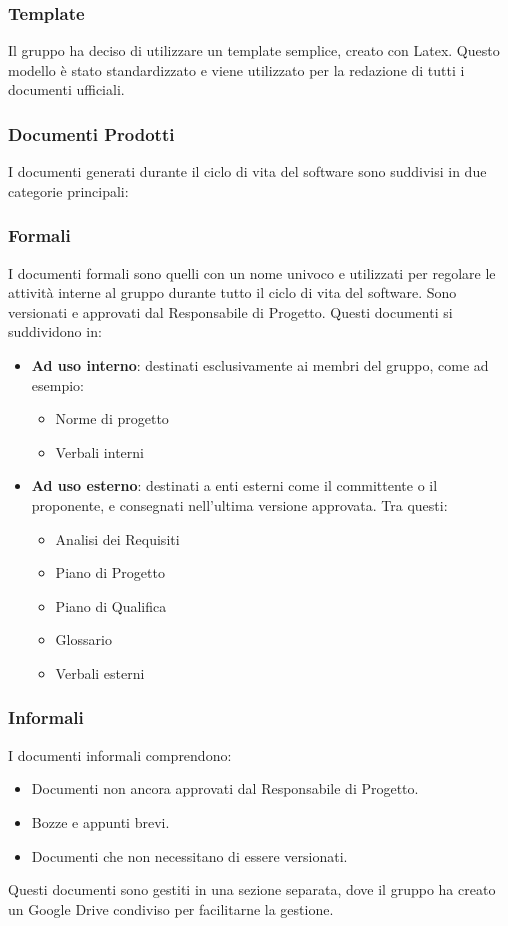 \subsubsection{Template}
Il gruppo ha deciso di utilizzare un template semplice, creato con Latex. Questo modello è stato 
standardizzato e viene utilizzato per la redazione di tutti i documenti ufficiali.

\subsubsection{Documenti Prodotti}

I documenti generati durante il ciclo di vita del software sono suddivisi in due categorie principali:

\subsubsection*{Formali}
I documenti formali sono quelli con un nome univoco e utilizzati per regolare le attività interne al gruppo 
durante tutto il ciclo di vita del software. 
Sono versionati e approvati dal Responsabile di Progetto. 
Questi documenti si suddividono in:
\begin{itemize}
    \item \textbf{Ad uso interno}: destinati esclusivamente ai membri del gruppo, come ad esempio:
    \begin{itemize}
        \item Norme di progetto
        \item Verbali interni
    \end{itemize}
    \item \textbf{Ad uso esterno}: destinati a enti esterni come il committente o il proponente, e consegnati 
    nell'ultima versione approvata. Tra questi:
    \begin{itemize}
        \item Analisi dei Requisiti
        \item Piano di Progetto
        \item Piano di Qualifica
        \item Glossario
        \item Verbali esterni
    \end{itemize}
\end{itemize}

\subsubsection*{Informali}
I documenti informali comprendono:
\begin{itemize}
    \item Documenti non ancora approvati dal Responsabile di Progetto.
    \item Bozze e appunti brevi.
    \item Documenti che non necessitano di essere versionati.
\end{itemize}
Questi documenti sono gestiti in una sezione separata, dove il gruppo ha creato un Google Drive condiviso per 
facilitarne la gestione.

